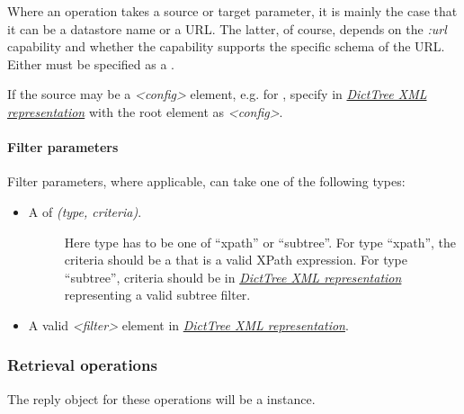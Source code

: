 \documentclass[a4paper,10pt,english]{manual}
\begin{document}
Where an operation takes a source or target parameter, it is mainly the case that it can be a datastore name or a URL. The latter, of course, depends on the \emph{:url} capability and whether the capability supports the specific schema of the URL. Either must be specified as a \href{http://docs.python.org/library/string.html\#string}{}.

If the source may be a \emph{\textless{}config\textgreater{}} element, e.g. for \hyperlink{ncclient.operations.Validate}{}, specify in \hyperlink{dtree}{\emph{DictTree XML representation}} with the root element as \emph{\textless{}config\textgreater{}}.
\hypertarget{filter}{}

\paragraph{Filter parameters}

Filter parameters, where applicable, can take one of the following types:
\begin{itemize}
\item {} \begin{description}
\item[A \href{http://docs.python.org/library/functions.html\#tuple}{} of \emph{(type, criteria)}.]
Here type has to be one of ``xpath'' or ``subtree''. For type ``xpath'', the criteria should be a \href{http://docs.python.org/library/string.html\#string}{} that is a valid XPath expression. For type ``subtree'', criteria should be in \hyperlink{dtree}{\emph{DictTree XML representation}} representing a valid subtree filter.

\end{description}

\item {} 
A valid \emph{\textless{}filter\textgreater{}} element in \hyperlink{dtree}{\emph{DictTree XML representation}}.

\end{itemize}


\subsubsection{Retrieval operations}

The reply object for these operations will be a \hyperlink{ncclient.operations.GetReply}{} instance.
\end{document}

